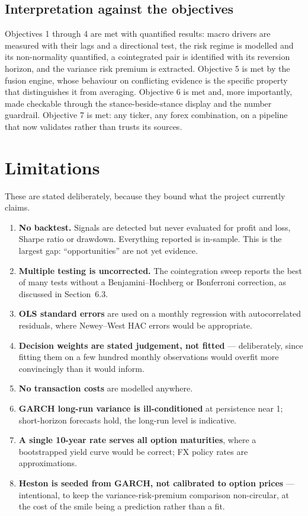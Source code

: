 \documentclass[11pt,a4paper]{article}
\begin{document}
\subsection{Interpretation against the objectives}

Objectives 1 through 4 are met with quantified results: macro drivers are measured with
their lags and a directional test, the risk regime is modelled and its non-normality
quantified, a cointegrated pair is identified with its reversion horizon, and the variance
risk premium is extracted. Objective 5 is met by the fusion engine, whose behaviour on
conflicting evidence is the specific property that distinguishes it from averaging.
Objective 6 is met and, more importantly, made checkable through the stance-beside-stance
display and the number guardrail. Objective 7 is met: any ticker, any forex combination, on
a pipeline that now validates rather than trusts its sources.

\section{Limitations}

These are stated deliberately, because they bound what the project currently claims.

\begin{enumerate}
\item \textbf{No backtest.} Signals are detected but never evaluated for profit and loss,
Sharpe ratio or drawdown. Everything reported is in-sample. This is the largest gap:
``opportunities'' are not yet evidence.
\item \textbf{Multiple testing is uncorrected.} The cointegration sweep reports the best of
many tests without a Benjamini--Hochberg or Bonferroni correction, as discussed in
Section~6.3.
\item \textbf{OLS standard errors} are used on a monthly regression with autocorrelated
residuals, where Newey--West HAC errors would be appropriate.
\item \textbf{Decision weights are stated judgement, not fitted} --- deliberately, since
fitting them on a few hundred monthly observations would overfit more convincingly than it
would inform.
\item \textbf{No transaction costs} are modelled anywhere.
\item \textbf{GARCH long-run variance is ill-conditioned} at persistence near 1;
short-horizon forecasts hold, the long-run level is indicative.
\item \textbf{A single 10-year rate serves all option maturities}, where a bootstrapped
yield curve would be correct; FX policy rates are approximations.
\item \textbf{Heston is seeded from GARCH, not calibrated to option prices} ---
intentional, to keep the variance-risk-premium comparison non-circular, at the cost of the
smile being a prediction rather than a fit.
\end{enumerate}
\end{document}
